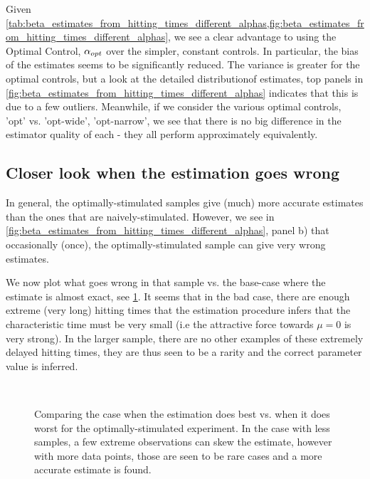 \documentclass{article}
\begin{document}
Given
\cref{tab:beta_estimates_from_hitting_times_different_alphas,fig:beta_estimates_from_hitting_times_different_alphas},
we see a clear advantage to using the Optimal Control, ${\alpha}_{opt}$ over the
simpler, constant controls. In particular, the bias of the estimates seems to
be significantly reduced. The variance is greater for the optimal controls, but
a look at the detailed distributionof estimates, top panels in
\cref{fig:beta_estimates_from_hitting_times_different_alphas} indicates that
this is due to a few outliers. Meanwhile, if we consider the various optimal
controls, 'opt' vs. 'opt-wide', 'opt-narrow', we see that there is no big
difference in the estimator quality of each - they all perform approximately
equivalently. 


\subsection{Closer look when the estimation goes wrong}
In general, the optimally-stimulated samples give (much) more accurate estimates
than the ones that are naively-stimulated. However, we see in
\cref{fig:beta_estimates_from_hitting_times_different_alphas}, panel b) that
occasionally (once), the optimally-stimulated sample can give very wrong
estimates.

We now plot what goes wrong in that sample vs. the base-case where the estimate
is almost exact, see \cref{fig:batch_estimtion_in_detail}. It seems that in the
bad case, there are enough extreme (very long) hitting times that the estimation
procedure infers that the characteristic time must be very small (i.e the
attractive force towards $\mu=0$ is very strong). In the larger sample, there
are no other examples of these extremely delayed hitting times, they are thus
seen to be a rarity and the correct parameter value is inferred.

\begin{figure}[h]
\begin{center} 
\\
\caption[Estimation Detail View for the Optimally-Stimulated
Experiment]{Comparing the case when the estimation does best vs. when it does
worst for the optimally-stimulated experiment. In the case with less samples, a
few extreme observations can skew the estimate, however with more data points,
those are seen to be rare cases and a more accurate estimate is found.}
\label{fig:batch_estimtion_in_detail}
\end{center}
\end{figure}
\end{document}
